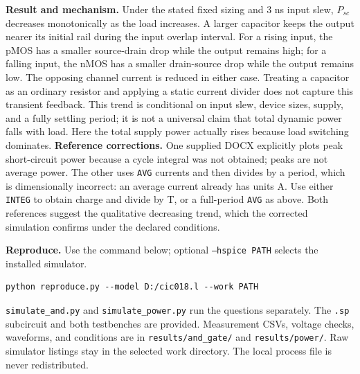 \documentclass[11pt,a4paper]{article}
\begin{document}
\textbf{Result and mechanism.} Under the stated fixed sizing and 3 ns input slew, $P_{sc}$ decreases monotonically as the load increases. A larger capacitor keeps the output nearer its initial rail during the input overlap interval. For a rising input, the pMOS has a smaller source-drain drop while the output remains high; for a falling input, the nMOS has a smaller drain-source drop while the output remains low. The opposing channel current is reduced in either case. Treating a capacitor as an ordinary resistor and applying a static current divider does not capture this transient feedback.
This trend is conditional on input slew, device sizes, supply, and a fully settling period; it is not a universal claim that total dynamic power falls with load. Here the total supply power actually rises because load switching dominates.
\textbf{Reference corrections.} One supplied DOCX explicitly plots peak short-circuit power because a cycle integral was not obtained; peaks are not average power. The other uses \texttt{AVG} currents and then divides by a period, which is dimensionally incorrect: an average current already has units A. Use either \texttt{INTEG} to obtain charge and divide by T, or a full-period \texttt{AVG} as above. Both references suggest the qualitative decreasing trend, which the corrected simulation confirms under the declared conditions.

\textbf{Reproduce.} Use the command below; optional \texttt{--hspice PATH} selects the installed simulator.
\begin{lstlisting}
python reproduce.py --model D:/cic018.l --work PATH
\end{lstlisting} \texttt{simulate\_and.py} and \texttt{simulate\_power.py} run the questions separately. The \texttt{.sp} subcircuit and both testbenches are provided. Measurement CSVs, voltage checks, waveforms, and conditions are in \texttt{results/and\_gate/} and \texttt{results/power/}. Raw simulator listings stay in the selected work directory. The local process file is never redistributed.
\end{document}
